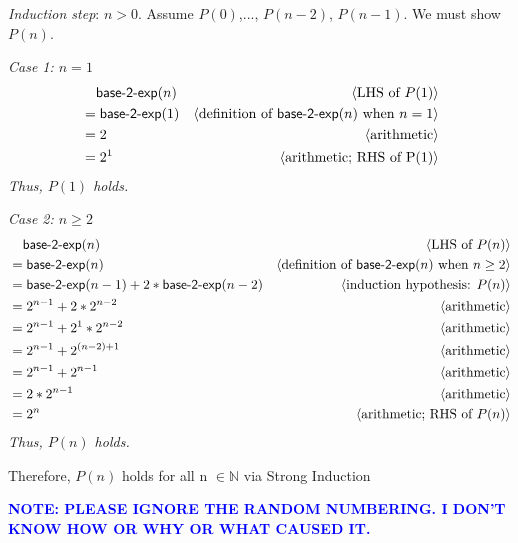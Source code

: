 \documentclass[11pt,fleqn]{article}
\newcommand{\mname}[1]{\mbox{\sf #1}}
\newcommand{\pnote}[1]{{\langle \text{#1} \rangle}}
\begin{document}
\begin{enumerate}
\bigskip

\emph{Induction step}: $n > 0$. Assume $P(0)$,..., $P(n - 2)$, $P(n - 1)$. We must show $P(n)$.

\em{Case 1}: $n = 1$ 
\begin{align}
  &\phantom{{}=}
     \mname{base-2-exp}(n)                   
        & \pnote{LHS of $P(1)$}\\
  &= \mname{base-2-exp}(1)                                   
        & \pnote{definition of $\textstyle{\mname{base-2-exp}(n)}$ when $n = 1$}\\
  &= 2                       
        & \pnote{arithmetic}\\
  &= 2^1                 
        & \pnote{arithmetic; RHS of P(1)}
\end{align}
Thus, $P(1)$ holds.


\bigskip

\em{Case 2}: $n \ge 2$ 
\begin{align}
  &\phantom{{}=}
     \mname{base-2-exp}(n)                   
        & \pnote{LHS of $P(n)$}\\
  &= \mname{base-2-exp}(n)                                   
        & \pnote{definition of $\textstyle{\mname{base-2-exp}(n)}$ when $n \ge 2$}\\
  &= \mname{base-2-exp}(n - 1) + 2 * \mname{base-2-exp}(n - 2)                
        & \pnote{induction hypothesis: $P(n)$}\\
  &= 2^{n-1} + 2 * 2^{n-2}        
        & \pnote{arithmetic} \\ 
  &= 2^{n-1} + 2^1 * 2^{n-2} 
        & \pnote{arithmetic} \\ 
  &= 2^{n-1} + 2^{(n-2) + 1} 
        & \pnote{arithmetic} \\ 
  &= 2^{n-1} + 2^{n-1} 
        & \pnote{arithmetic} \\ 
  &= 2 * 2^{n-1}
        & \pnote{arithmetic} \\ 
  &= 2^n
        & \pnote{arithmetic; RHS of $P(n)$}
\end{align}
Thus, $P(n)$ holds.

\bigskip

Therefore, $P(n)$ holds for all n $\in \mathbb{N}$ via Strong Induction

\bigskip

\textcolor{blue}{\textbf{NOTE: PLEASE IGNORE THE RANDOM NUMBERING. I DON'T KNOW HOW OR WHY OR WHAT CAUSED IT.}}


\end{enumerate}
\end{document}
